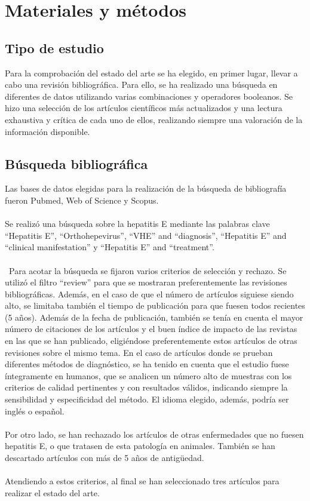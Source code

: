 \documentclass[11 pt]{article}
\begin{document}
\section{Materiales y métodos}
\subsection{Tipo de estudio}
Para la comprobación del estado del arte se ha elegido, en primer lugar, llevar a cabo una revisión bibliográfica. Para ello, se ha realizado una búsqueda en diferentes de datos utilizando varias combinaciones y operadores booleanos. Se hizo una selección de los artículos científicos más actualizados y una lectura exhaustiva y crítica de cada uno de ellos, realizando siempre una valoración de la información disponible. 
\subsection{Búsqueda bibliográfica}
Las bases de datos elegidas para la realización de la búsqueda de bibliografía fueron Pubmed, Web of Science y Scopus.\\\\  
Se realizó una búsqueda sobre la hepatitis E mediante las palabras clave “Hepatitis E”, “Orthohepevirus”, “VHE” and “diagnosis”, “Hepatitis E” and “clinical manifestation” y “Hepatitis E” and “treatment”. \\\\\
Para acotar la búsqueda se fijaron varios criterios de selección y rechazo. Se utilizó el filtro “review” para que se mostraran preferentemente las revisiones bibliográficas. Además, en el caso de que el número de artículos siguiese siendo alto, se limitaba también el tiempo de publicación para que fuesen todos recientes (5 años). Además de la fecha de publicación, también se tenía en cuenta el mayor número de citaciones de los artículos y el buen índice de impacto de las revistas en las que se han publicado, eligiéndose preferentemente estos artículos de otras revisiones sobre el mismo tema. En el caso de artículos donde se prueban diferentes métodos de diagnóstico, se ha tenido en cuenta que el estudio fuese íntegramente en humanos, que se analicen un número alto de muestras con los criterios de calidad pertinentes y con resultados válidos, indicando siempre la sensibilidad y especificidad del método. El idioma elegido, además, podría ser inglés o español.\\\\ 
Por otro lado, se han rechazado los artículos de otras enfermedades que no fuesen hepatitis E, o que tratasen de esta patología en animales. También se han descartado artículos con más de 5 años de antigüedad.\\\\    
Atendiendo a estos criterios, al final se han seleccionado tres artículos para realizar el estado del arte.
\end{document}
